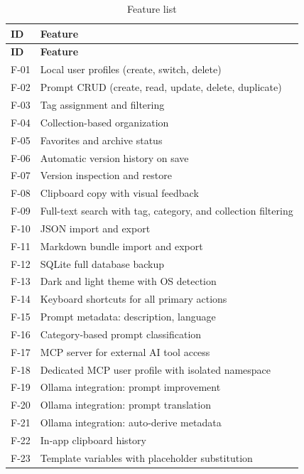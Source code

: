 \documentclass[a4paper, 11pt, oneside]{report}
\begin{document}
\begin{longtable}{l L{10cm}}
  \caption{Feature list}
  \label{tab:features} \\
  \toprule
  \textbf{ID} & \textbf{Feature} \\
  \midrule
  \endfirsthead
  \toprule
  \textbf{ID} & \textbf{Feature} \\
  \midrule
  \endhead
  F-01 & Local user profiles (create, switch, delete) \\
  F-02 & Prompt CRUD (create, read, update, delete, duplicate) \\
  F-03 & Tag assignment and filtering \\
  F-04 & Collection-based organization \\
  F-05 & Favorites and archive status \\
  F-06 & Automatic version history on save \\
  F-07 & Version inspection and restore \\
  F-08 & Clipboard copy with visual feedback \\
  F-09 & Full-text search with tag, category, and collection filtering \\
  F-10 & JSON import and export \\
  F-11 & Markdown bundle import and export \\
  F-12 & SQLite full database backup \\
  F-13 & Dark and light theme with OS detection \\
  F-14 & Keyboard shortcuts for all primary actions \\
  F-15 & Prompt metadata: description, language \\
  F-16 & Category-based prompt classification \\
  F-17 & MCP server for external AI tool access \\
  F-18 & Dedicated MCP user profile with isolated namespace \\
  F-19 & Ollama integration: prompt improvement \\
  F-20 & Ollama integration: prompt translation \\
  F-21 & Ollama integration: auto-derive metadata \\
  F-22 & In-app clipboard history \\
  F-23 & Template variables with placeholder substitution \\
  \bottomrule
\end{longtable}


\end{document}
